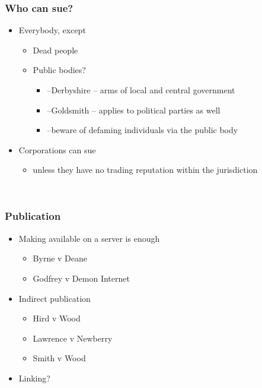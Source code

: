 \documentclass[ignorenonframetext,]{beamer}
\begin{document}
\begin{frame}
\frametitle{Who can sue?}

\begin{itemize}
\item  Everybody, except

  \begin{itemize}
  \item    Dead people
  \item    Public bodies?

    \begin{itemize}
    \item      {--}{Derbyshire}{ -- arms of local and central government}
    \item      {--}{Goldsmith}{ -- applies to political parties as well}
    \item      {--}{beware of defaming individuals via the public body}
    \end{itemize}
  \end{itemize}
\item  {Corporations can sue}

  \begin{itemize}
  \item    {unless they have no trading reputation within the
    jurisdiction}
  \end{itemize}
\end{itemize}

~


\end{frame}

\begin{frame}
\frametitle{Publication}

\begin{itemize}
\item  Making available on a server is enough

  \begin{itemize}
  \item    Byrne v Deane
  \item    Godfrey v Demon Internet
  \end{itemize}
\item  Indirect publication

  \begin{itemize}
  \item    Hird v Wood
  \item    Lawrence v Newberry
  \item    Smith v Wood
  \end{itemize}
\item  Linking?
\end{itemize}

~


\end{frame}
\end{document}
